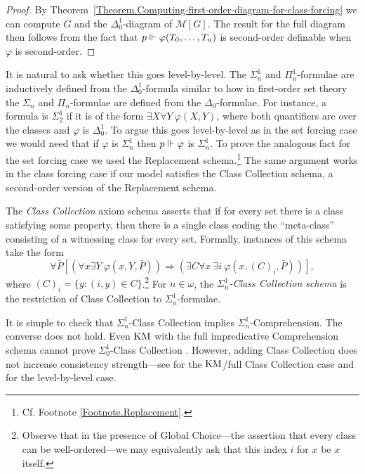 \documentclass{amsart}
\begin{document}
\begin{proof}
By Theorem~\ref{Theorem.Computing-first-order-diagram-for-class-forcing} we can compute $G$ and the $\Delta^1_0$-diagram of $\mathcal M[G]$. The result for the full diagram then follows from the fact that $p \Vdash \varphi(T_0, \ldots, T_n)$ is second-order definable when $\varphi$ is second-order.
\end{proof}

It is natural to ask whether this goes level-by-level. The $\Sigma^1_n$ and $\Pi^1_n$-formulae are inductively defined from the $\Delta^1_0$-formula similar to how in first-order set theory the $\Sigma_n$ and $\Pi_n$-formulae are defined from the $\Delta_0$-formulae. For instance, a formula is $\Sigma^1_2$ if it is of the form $\exists X \forall Y\ \varphi(X,Y)$, where both quantifiers are over the classes and $\varphi$ is $\Delta^1_0$. To argue this goes level-by-level as in the set forcing case we would need that if $\varphi$ is $\Sigma^1_n$ then $p \Vdash \varphi$ is $\Sigma^1_n$. To prove the analogous fact for the set forcing case we used the Replacement schema.\footnote{Cf. Footnote \ref{Footnote.Replacement}.} The same argument works in the class forcing case if our model satisfies the Class Collection schema, a second-order version of the Replacement schema.

\begin{definition}
The \emph{Class Collection} axiom schema asserts that if for every set there is a class satisfying some property, then there is a single class coding the ``meta-class'' consisting of a witnessing class for every set. Formally, instances of this schema take the form
$$\forall \bar P \left[ (\forall x \exists Y\ \varphi(x,Y,\bar P)) \Rightarrow (\exists C \forall x\ \exists i\  \varphi(x,(C)_i,\bar P)) \right],$$
where $(C)_i = \{ y : (i,y) \in C \}$.\footnote{Observe that in the presence of Global Choice---the assertion that every class can be well-ordered---we may equivalently ask that this index $i$ for $x$ be $x$ itself.}
For $n \in \omega$, the \emph{$\Sigma^1_n$-Class Collection schema} is the restriction of Class Collection to $\Sigma^1_n$-formulae.
\end{definition}

It is simple to check that $\Sigma^1_n$-Class Collection implies $\Sigma^1_n$-Comprehension. The converse does not hold. Even ${\rm KM}$ with the full impredicative Comprehension schema cannot prove $\Sigma^1_0$-Class Collection \cite{gitman-hamkins-karagila:submitted}.
However, adding Class Collection does not increase consistency strength---see \cite[Theorem 2.5]{marek-mostowski1975} for the ${\rm KM}$/full Class Collection case and \cite{ratajczyk1979} for the level-by-level case.
\end{document}
